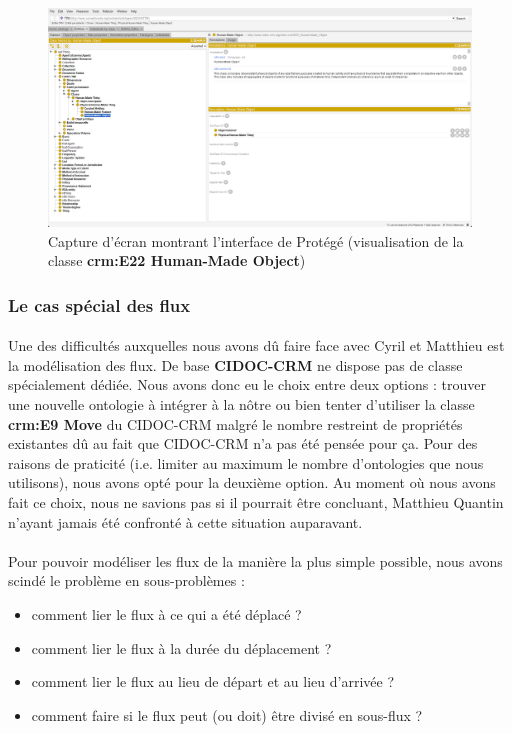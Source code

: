 \begin{figure} [H]
    \centering
    \includegraphics[width=1\textwidth]{assets/ontologie/Protege/screen_exemple_protege.png}
    \caption{Capture d'écran montrant l'interface de Protégé (visualisation de la classe \textbf{crm:E22 Human-Made Object})}
    \label{fig:screenExempleProtege}
\end{figure}

\subsubsection{Le cas spécial des flux}

\paragraph{} \hspace{10mm}
Une des difficultés auxquelles nous avons dû faire face avec Cyril et Matthieu est la modélisation des flux. De base \textbf{CIDOC-CRM} ne dispose pas de classe spécialement dédiée. Nous avons donc eu le choix entre deux options : trouver une nouvelle ontologie à intégrer à la nôtre ou bien tenter d'utiliser la classe \textbf{crm:E9 Move} du CIDOC-CRM malgré le nombre restreint de propriétés existantes dû au fait que CIDOC-CRM n'a pas été pensée pour ça. Pour des raisons de praticité (i.e. limiter au maximum le nombre d'ontologies que nous utilisons), nous avons opté pour la deuxième option. Au moment où nous avons fait ce choix, nous ne savions pas si il pourrait être concluant, Matthieu Quantin n'ayant jamais été confronté à cette situation auparavant.

\paragraph{} \hspace{10mm}
Pour pouvoir modéliser les flux de la manière la plus simple possible, nous avons scindé le problème en sous-problèmes : 
\begin{itemize}
    \item[\ding{103}] comment lier le flux à ce qui a été déplacé ?
    \item[\ding{103}] comment lier le flux à la durée du déplacement ?
    \item[\ding{103}] comment lier le flux au lieu de départ et au lieu d'arrivée ?
    \item[\ding{103}] comment faire si le flux peut (ou doit) être divisé en sous-flux ?
\end{itemize}

